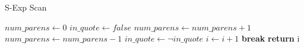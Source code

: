 \begin{algorithm}
\caption{S-Exp Scan} \label{algo:sexpscan}
\begin{algorithmic}
  \State $num\_parens \gets 0$
  \State $in\_quote \gets false$
        \State $num\_parens \gets num\_parens + 1$
      \EndIf
        \State $num\_parens \gets num\_parens - 1$
      \EndIf
      \State $in\_quote \gets \neg in\_quote$
    \EndIf
    \State $i \gets i + 1$
      \State \textbf{break}
    \EndIf
  \EndWhile
  \State \textbf{return} i
\EndProcedure
\end{algorithmic}
\end{algorithm}

